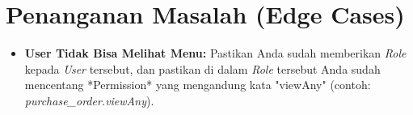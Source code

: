 \section{Penanganan Masalah (Edge Cases)}
\begin{itemize}
    \item \textbf{User Tidak Bisa Melihat Menu:} Pastikan Anda sudah memberikan \textit{Role} kepada \textit{User} tersebut, dan pastikan di dalam \textit{Role} tersebut Anda sudah mencentang *Permission* yang mengandung kata "viewAny" (contoh: \textit{purchase\_order.viewAny}).
\end{itemize}
